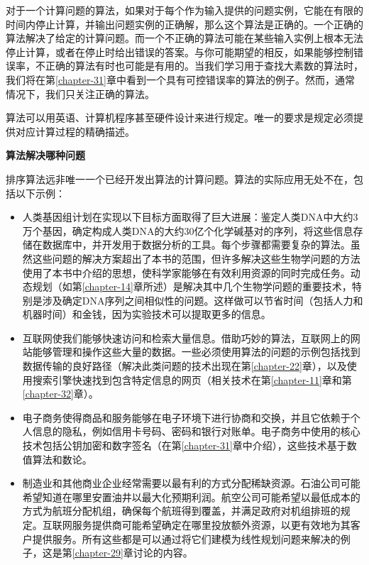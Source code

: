 \documentclass[lang=cn,newtx,10pt,scheme=chinese]{elegantbook}
\begin{document}
对于一个计算问题的算法，如果对于每个作为输入提供的问题实例，它能在有限的时间内停止计算，并输出问题实例的正确解，那么这个算法是正确的。一个正确的算法解决了给定的计算问题。而一个不正确的算法可能在某些输入实例上根本无法停止计算，或者在停止时给出错误的答案。与你可能期望的相反，如果能够控制错误率，不正确的算法有时也可能是有用的。当我们学习用于查找大素数的算法时，我们将在第\ref{chapter-31}章中看到一个具有可控错误率的算法的例子。然而，通常情况下，我们只关注正确的算法。

算法可以用英语、计算机程序甚至硬件设计来进行规定。唯一的要求是规定必须提供对应计算过程的精确描述。

\textbf{算法解决哪种问题}

排序算法远非唯一一个已经开发出算法的计算问题。算法的实际应用无处不在，包括以下示例：

\begin{itemize}
    \item 人类基因组计划在实现以下目标方面取得了巨大进展：鉴定人类DNA中大约3万个基因，确定构成人类DNA的大约30亿个化学碱基对的序列，将这些信息存储在数据库中，并开发用于数据分析的工具。每个步骤都需要复杂的算法。虽然这些问题的解决方案超出了本书的范围，但许多解决这些生物学问题的方法使用了本书中介绍的思想，使科学家能够在有效利用资源的同时完成任务。动态规划（如第\ref{chapter-14}章所述）是解决其中几个生物学问题的重要技术，特别是涉及确定DNA序列之间相似性的问题。这样做可以节省时间（包括人力和机器时间）和金钱，因为实验技术可以提取更多的信息。
    \item 互联网使我们能够快速访问和检索大量信息。借助巧妙的算法，互联网上的网站能够管理和操作这些大量的数据。一些必须使用算法的问题的示例包括找到数据传输的良好路径（解决此类问题的技术出现在第\ref{chapter-22}章），以及使用搜索引擎快速找到包含特定信息的网页（相关技术在第\ref{chapter-11}章和第\ref{chapter-32}章）。
    \item 电子商务使得商品和服务能够在电子环境下进行协商和交换，并且它依赖于个人信息的隐私，例如信用卡号码、密码和银行对账单。电子商务中使用的核心技术包括公钥加密和数字签名（在第\ref{chapter-31}章中介绍），这些技术基于数值算法和数论。
    \item 制造业和其他商业企业经常需要以最有利的方式分配稀缺资源。石油公司可能希望知道在哪里安置油井以最大化预期利润。航空公司可能希望以最低成本的方式为航班分配机组，确保每个航班得到覆盖，并满足政府对机组排班的规定。互联网服务提供商可能希望确定在哪里投放额外资源，以更有效地为其客户提供服务。所有这些都是可以通过将它们建模为线性规划问题来解决的例子，这是第\ref{chapter-29}章讨论的内容。
\end{itemize}
\end{document}
